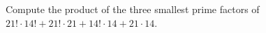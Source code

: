 Compute the product of the three smallest prime factors of $21!\cdot14!+21!\cdot21+14!\cdot14+21\cdot14$.
